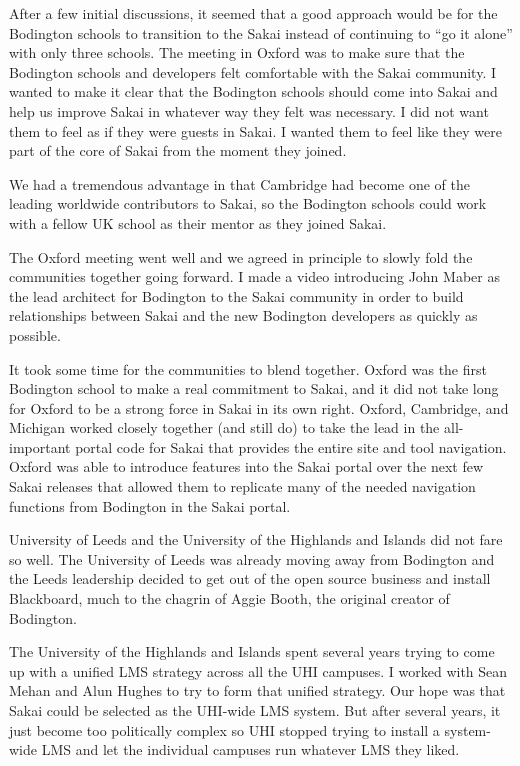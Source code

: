 \documentclass[12pt]{book}
\begin{document}
After a few initial discussions, it seemed that a good approach would
be for the Bodington schools to transition to the Sakai instead
of continuing to ``go it alone'' with only three schools.  The meeting
in Oxford was to make sure that the Bodington schools and developers
felt comfortable with the Sakai community.  I wanted to make it
clear that the Bodington schools should come into Sakai and help
us improve Sakai in whatever way they felt was necessary.   I did not
want them to feel as if they were guests in Sakai.  I wanted them to
feel like they were part of the core of Sakai from the moment they
joined.

We had a tremendous advantage in that Cambridge had become one of the leading
worldwide contributors to Sakai, so the Bodington schools could work
with a fellow UK school as their mentor as they joined Sakai.

The Oxford meeting went well and we agreed in principle to slowly
fold the communities together going forward.  I made a video introducing
John Maber as the lead architect for Bodington to the Sakai community
in order to build relationships between Sakai and the new Bodington
developers as quickly as possible.

It took some time for the communities to blend together.  Oxford was the first
Bodington
school to make a real commitment to Sakai, and it did not take long
for Oxford to be a strong force in Sakai in its own right.  Oxford, Cambridge,
and Michigan worked closely together (and still do) to take the lead in the
all-important portal code for Sakai that provides the entire site and
tool navigation.  Oxford was able to introduce features into the Sakai
portal over the next few Sakai releases that allowed them to replicate
many of the needed navigation functions from Bodington in the Sakai portal.

University of Leeds and the University of the Highlands and Islands did not fare
so well.  The University of Leeds was already moving away from Bodington and
the Leeds leadership decided to get out of the open source
business and install Blackboard, much to the chagrin of Aggie Booth, the
original creator of Bodington.

The University of the Highlands and Islands spent several years trying
to come up with a unified LMS strategy across all the UHI campuses.
I worked with Sean Mehan and Alun Hughes to try to form that unified
strategy.
Our hope was that Sakai could be selected as the UHI-wide LMS system.
But after several years, it just become too politically complex
so UHI stopped trying to install a system-wide
LMS and let the individual campuses run whatever LMS they liked.
\end{document}
